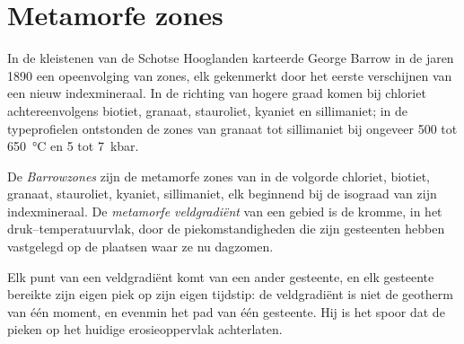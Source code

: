 \section{Metamorfe zones}\label{sec:b2:pt-paths:zones}

In de kleistenen van de Schotse Hooglanden karteerde George Barrow in de jaren 1890 een opeenvolging van
zones, elk gekenmerkt door het eerste verschijnen van een nieuw indexmineraal. In de richting van hogere
graad komen bij chloriet achtereenvolgens biotiet, granaat, stauroliet, kyaniet en sillimaniet;
in de typeprofielen ontstonden de zones van granaat tot sillimaniet bij ongeveer 500 tot
\qty{650}{\celsius} en 5 tot \qty{7}{kbar}.

\begin{definition}\label{def:b2:pt-paths:barrovian}
De \emph{Barrowzones} zijn de metamorfe zones van
 in de volgorde chloriet, biotiet, granaat, stauroliet, kyaniet, sillimaniet,
elk beginnend bij de isograad van zijn indexmineraal. De \emph{metamorfe
veldgradiënt} van een gebied is de kromme, in het
druk--temperatuurvlak, door de piekomstandigheden die zijn gesteenten hebben vastgelegd op de
plaatsen waar ze nu dagzomen.
\end{definition}

Elk punt van een veldgradiënt komt van een ander gesteente, en elk gesteente bereikte zijn eigen
piek op zijn eigen tijdstip: de veldgradiënt is niet de geotherm van één moment, en evenmin het
pad van één gesteente. Hij is het spoor dat de pieken op het huidige erosieoppervlak achterlaten.


